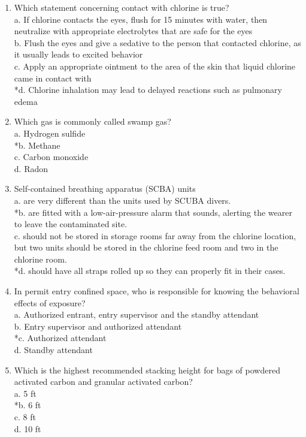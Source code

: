 \begin{enumerate}[1.]
 \item Which statement concerning contact with chlorine is true?\\
a. If chlorine contacts the eyes, flush for 15 minutes with water, then neutralize with appropriate electrolytes that are safe for the eyes\\
b. Flush the eyes and give a sedative to the person that contacted chlorine, as it usually leads to excited behavior\\
c. Apply an appropriate ointment to the area of the skin that liquid chlorine came in contact with\\
*d. Chlorine inhalation may lead to delayed reactions such as pulmonary edema\\

  \item Which gas is commonly called swamp gas?\\
a. Hydrogen sulfide\\
*b. Methane\\
c. Carbon monoxide\\
d. Radon\\

  \item Self-contained breathing apparatus (SCBA) units\\
a. are very different than the units used by SCUBA divers.\\
*b. are fitted with a low-air-pressure alarm that sounds, alerting the wearer to leave the contaminated site.\\
c. should not be stored in storage rooms far away from the chlorine location, but two units should be stored in the chlorine feed room and two in the chlorine room.\\
*d. should have all straps rolled up so they can properly fit in their cases.\\

  \item In permit entry confined space, who is responsible for knowing the behavioral effects of exposure?\\
a. Authorized entrant, entry supervisor and the standby attendant\\
b. Entry supervisor and authorized attendant\\
*c. Authorized attendant\\
d. Standby attendant\\

  \item Which is the highest recommended stacking height for bags of powdered activated carbon and granular activated carbon?\\
a. 5 ft\\
*b. 6 ft\\
c. 8 ft\\
d. 10 ft\\


\end{enumerate}
